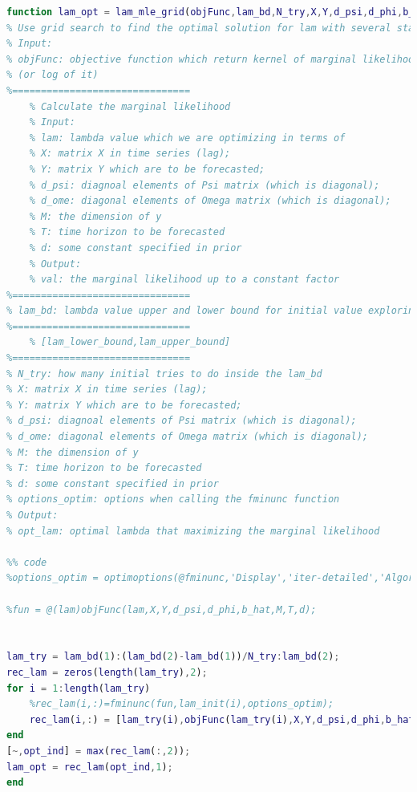 \documentclass[11pt, oneside]{article}   	%
\begin{document}
\begin{lstlisting}[language=Matlab ,caption={Matlab code for find the optimal $ \lambda$ using grid search.}, label={code:MMLE_grid}]
function lam_opt = lam_mle_grid(objFunc,lam_bd,N_try,X,Y,d_psi,d_phi,b_hat,M,T,d)
% Use grid search to find the optimal solution for lam with several starting points
% Input:
% objFunc: objective function which return kernel of marginal likelihood
% (or log of it)
%===============================
    % Calculate the marginal likelihood
    % Input:
    % lam: lambda value which we are optimizing in terms of
    % X: matrix X in time series (lag);
    % Y: matrix Y which are to be forecasted;
    % d_psi: diagnoal elements of Psi matrix (which is diagonal);
    % d_ome: diagonal elements of Omega matrix (which is diagonal);
    % M: the dimension of y
    % T: time horizon to be forecasted
    % d: some constant specified in prior
    % Output:
    % val: the marginal likelihood up to a constant factor
%===============================
% lam_bd: lambda value upper and lower bound for initial value exploring
%===============================
    % [lam_lower_bound,lam_upper_bound]
%===============================
% N_try: how many initial tries to do inside the lam_bd
% X: matrix X in time series (lag);
% Y: matrix Y which are to be forecasted;
% d_psi: diagnoal elements of Psi matrix (which is diagonal);
% d_ome: diagonal elements of Omega matrix (which is diagonal);
% M: the dimension of y
% T: time horizon to be forecasted
% d: some constant specified in prior
% options_optim: options when calling the fminunc function
% Output:
% opt_lam: optimal lambda that maximizing the marginal likelihood

%% code
%options_optim = optimoptions(@fminunc,'Display','iter-detailed','Algorithm','trust-region','SpecifyObjectiveGradient',true);

%fun = @(lam)objFunc(lam,X,Y,d_psi,d_phi,b_hat,M,T,d);


lam_try = lam_bd(1):(lam_bd(2)-lam_bd(1))/N_try:lam_bd(2);
rec_lam = zeros(length(lam_try),2);
for i = 1:length(lam_try)
    %rec_lam(i,:)=fminunc(fun,lam_init(i),options_optim);
    rec_lam(i,:) = [lam_try(i),objFunc(lam_try(i),X,Y,d_psi,d_phi,b_hat,M,T,d)];
end
[~,opt_ind] = max(rec_lam(:,2));
lam_opt = rec_lam(opt_ind,1);
end
\end{lstlisting}
\end{document}
